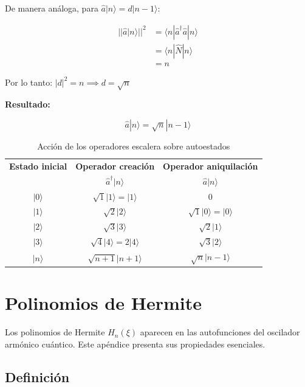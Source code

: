 De manera análoga, para $\hat{a}|n\rangle = d|n-1\rangle$:

\begin{align}
	||\hat{a}|n\rangle||^2 &= \langle n|\hat{a}^\dagger\hat{a}|n\rangle \\
	&= \langle n|\hat{N}|n\rangle \\
	&= n
\end{align}

Por lo tanto: $|d|^2 = n \implies d = \sqrt{n}$

\textbf{Resultado:}

\begin{equation}
	\boxed{\hat{a}|n\rangle = \sqrt{n}|n-1\rangle}
\end{equation}

\begin{table}[h]
	\centering
	\caption{Acción de los operadores escalera sobre autoestados}
	\label{tab:operadores_escalera}
	\begin{tabular}{ccc}
		\hline
		\textbf{Estado inicial} & \textbf{Operador creación} & \textbf{Operador aniquilación} \\
		& $\hat{a}^\dagger|n\rangle$ & $\hat{a}|n\rangle$ \\
		\hline
		$|0\rangle$ & $\sqrt{1}|1\rangle = |1\rangle$ & $0$ \\
		$|1\rangle$ & $\sqrt{2}|2\rangle$ & $\sqrt{1}|0\rangle = |0\rangle$ \\
		$|2\rangle$ & $\sqrt{3}|3\rangle$ & $\sqrt{2}|1\rangle$ \\
		$|3\rangle$ & $\sqrt{4}|4\rangle = 2|4\rangle$ & $\sqrt{3}|2\rangle$ \\
		$|n\rangle$ & $\sqrt{n+1}|n+1\rangle$ & $\sqrt{n}|n-1\rangle$ \\
		\hline
	\end{tabular}
\end{table}



\section{Polinomios de Hermite} \label{sec:hermite}

Los polinomios de Hermite $H_n(\xi)$ aparecen en las autofunciones del oscilador armónico cuántico. Este apéndice presenta sus propiedades esenciales.

\subsection{Definición}

